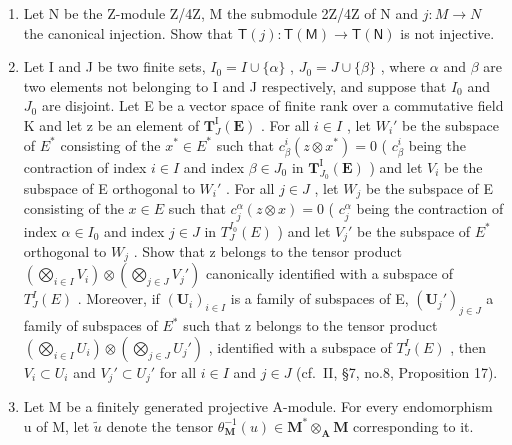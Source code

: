 \BourbakiExercisesSection

\begin{enumerate}
\def\labelenumi{\arabic{enumi}.}
\item
  Let N be the Z-module Z/4Z, M the submodule 2Z/4Z of N and \(j:M\to N\) the canonical injection. Show that \(\mathsf{T}(j):\mathsf{T}(\mathsf{M})\to\mathsf{T}(\mathsf{N})\) is not injective.
\item
  Let I and J be two finite sets, \(I_{0} = I \cup \{\alpha\}\) , \(J_{0} = J \cup \{\beta\}\) , where \(\alpha\) and \(\beta\) are two elements not belonging to I and J respectively, and suppose that \(I_{0}\) and \(J_{0}\) are disjoint. Let E be a vector space of finite rank over a commutative field K and let z be an element of \(\mathbf{T}_{J}^{\mathrm{I}}(\mathbf{E})\) . For all \(i \in I\) , let \(W_{i}'\) be the subspace of \(E^{*}\) consisting of the \(x^{*} \in E^{*}\) such that \(c_{\beta}^{i}(z \otimes x^{*}) = 0\) ( \(c_{\beta}^{i}\) being the contraction of index \(i \in I\) and index \(\beta \in J_{0}\) in \(\mathbf{T}_{J_{0}}^{\mathrm{I}}(\mathbf{E})\) ) and let \(V_{i}\) be the subspace of E orthogonal to \(W_{i}'\) . For all \(j \in J\) , let \(W_{j}\) be the subspace of E consisting of the \(x \in E\) such that \(c_{j}^{\alpha}(z \otimes x) = 0\) ( \(c_{j}^{\alpha}\) being the contraction of index \(\alpha \in I_{0}\) and index \(j \in J\) in \(T_{J}^{I_{0}}(E)\) ) and let \(V_{j}'\) be the subspace of \(E^{*}\) orthogonal to \(W_{j}\) . Show that z belongs to the tensor product \(\left(\bigotimes_{i \in I} V_{i}\right) \otimes \left(\bigotimes_{j \in J} V_{j}'\right)\) canonically identified with a subspace of \(T_{J}^{I}(E)\) . Moreover, if \((\mathbf{U}_{i})_{i \in I}\) is a family of subspaces of E, \((\mathbf{U}_{j}')_{j \in J}\) a family of subspaces of \(E^{*}\) such that z belongs to the tensor product \(\left(\bigotimes_{i \in I} U_{i}\right) \otimes \left(\bigotimes_{j \in J} U_{j}'\right)\) , identified with a subspace of \(T_{J}^{I}(E)\) , then \(V_{i} \subset U_{i}\) and \(V_{j}' \subset U_{j}'\) for all \(i \in I\) and \(j \in J\) (cf.~II, §7, no.8, Proposition 17).
\item
  Let M be a finitely generated projective A-module. For every endomorphism u of M, let \(\tilde{u}\) denote the tensor \(\theta_{\mathbf{M}}^{-1}(u) \in \mathbf{M}^{*} \otimes_{\mathbf{A}} \mathbf{M}\) corresponding to it.
\end{enumerate}

